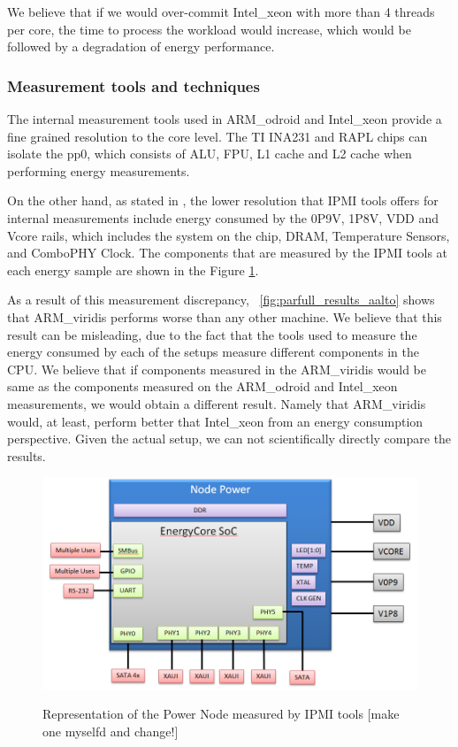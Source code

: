 We believe that if we would over-commit Intel\_xeon with more than 4 threads per core, the time to process the workload would increase, which would be followed by a degradation of energy performance.

\subsubsection*{Measurement tools and techniques}

The internal measurement tools used in ARM\_odroid and Intel\_xeon provide a fine grained resolution to the core level. The TI INA231 and RAPL chips can isolate the pp0, which consists of ALU, FPU, L1 cache and L2 cache when performing energy measurements. 

On the other hand, as stated in \cite{IPMI_resolution}, the lower resolution that IPMI tools offers for internal measurements include energy consumed by the 0P9V, 1P8V, VDD and Vcore rails, which includes the system on the chip, DRAM, Temperature Sensors, and ComboPHY Clock. The components that are measured by the IPMI tools at each energy sample are shown in the Figure \ref{fig:power_node_ipmitool}.

As a result of this measurement discrepancy, ~\ref{fig:parfull_results_aalto} shows that ARM\_viridis performs worse than any other machine. We believe that this result can be misleading, due to the fact that the tools used to measure the energy consumed by each of the setups measure different components in the CPU. We believe that if components measured in the ARM\_viridis would be same as the components measured on the ARM\_odroid and Intel\_xeon measurements, we would obtain a different result. Namely that ARM\_viridis would, at least, perform better that Intel\_xeon from an energy consumption perspective. Given the actual setup, we can not scientifically directly compare the results.

\begin{figure}[h!]
  \centering
    \includegraphics[width=150mm]{"img/aalto/power_node_ipmitool"}
    \label{fig:power_node_ipmitool}
    \caption{Representation of the Power Node measured by IPMI tools [make one myselfd and change!]}
\end{figure}


